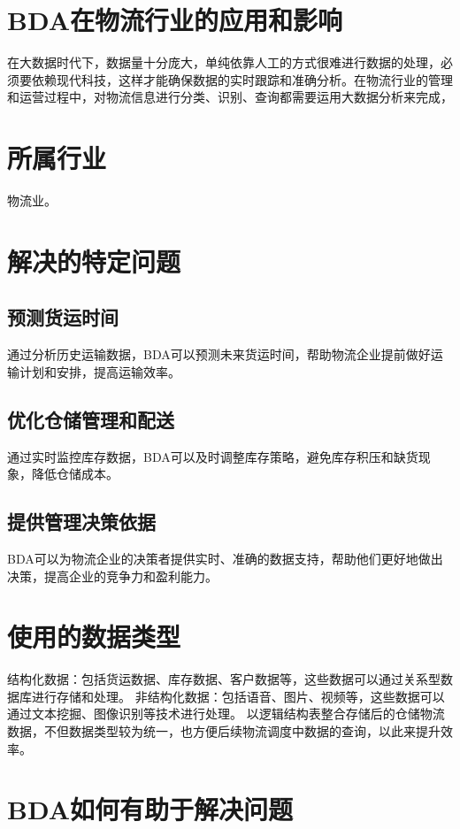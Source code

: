\section*{BDA在物流行业的应用和影响}
在大数据时代下，数据量十分庞大，单纯依靠人工的方式很难进行数据的处理，必须要依赖现代科技，这样才能确保数据的实时跟踪和准确分析。在物流行业的管理和运营过程中，对物流信息进行分类、识别、查询都需要运用大数据分析来完成，

\section{所属行业}
物流业。
    
\section{解决的特定问题}

\subsection{预测货运时间}
通过分析历史运输数据，BDA可以预测未来货运时间，帮助物流企业提前做好运输计划和安排，提高运输效率。

\subsection{优化仓储管理和配送}
通过实时监控库存数据，BDA可以及时调整库存策略，避免库存积压和缺货现象，降低仓储成本。


\subsection{提供管理决策依据}
BDA可以为物流企业的决策者提供实时、准确的数据支持，帮助他们更好地做出决策，提高企业的竞争力和盈利能力。

\section{使用的数据类型}
结构化数据：包括货运数据、库存数据、客户数据等，这些数据可以通过关系型数据库进行存储和处理。
非结构化数据：包括语音、图片、视频等，这些数据可以通过文本挖掘、图像识别等技术进行处理。
以逻辑结构表整合存储后的仓储物流数据，不但数据类型较为统一，也方便后续物流调度中数据的查询，以此来提升效率\cite{1}。
\section{BDA如何有助于解决问题}

